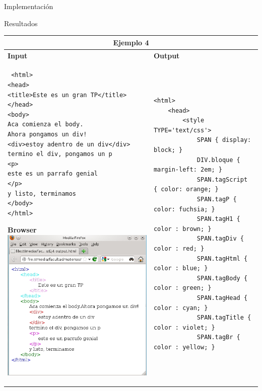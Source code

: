 \documentclass[a4paper,8pt]{article}
\begin{document}
\begin{section}{Implementación}
\begin{subsection}{Resultados}
\begin{tabular}{|p{6.5cm}|p{6.5cm}|}
\hline 
\multicolumn{2}{|c|}{Ejemplo 4}\\
\hline 
\textbf{Input}&\textbf{Output}\\
\hline
 \footnotesize{\begin{verbatim} <html>
<head>
<title>Este es un gran TP</title>
</head>
<body>
Aca comienza el body.
Ahora pongamos un div!
<div>estoy adentro de un div</div>
termino el div, pongamos un p
<p>
este es un parrafo genial
</p>
y listo, terminamos
</body>
</html>\end{verbatim}}  
\bigskip
\textbf{Browser}\linebreak \linebreak
\centering \includegraphics[scale=0.50]{ej4_out.jpg} & \footnotesize{\begin{verbatim}<html>
    <head>
        <style TYPE='text/css'>
            SPAN { display: block; }
            DIV.bloque { margin-left: 2em; }
            SPAN.tagScript { color: orange; }
            SPAN.tagP { color: fuchsia; }
            SPAN.tagH1 { color : brown; }
            SPAN.tagDiv { color : red; }
            SPAN.tagHtml { color : blue; }
            SPAN.tagBody { color : green; }
            SPAN.tagHead { color : cyan; }
            SPAN.tagTitle { color : violet; }
            SPAN.tagBr { color : yellow; }

\end{verbatim}}
\end{tabular}
\end{subsection}
\end{section}
\end{document}
